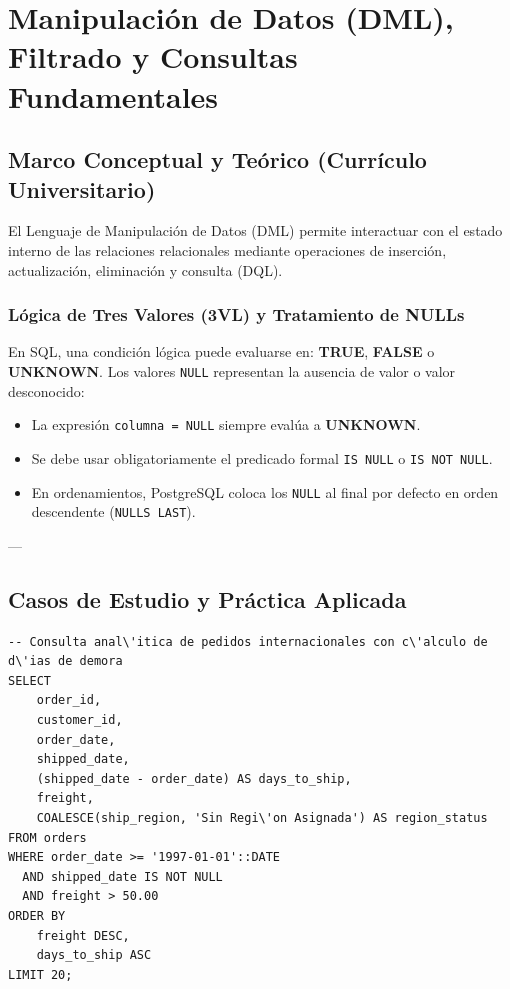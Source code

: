 \chapter{Manipulaci\'on de Datos (DML), Filtrado y Consultas Fundamentales}
\label{cap:dml_consultas_basicas}

\section{Marco Conceptual y Te\'orico (Curr\'iculo Universitario)}

El Lenguaje de Manipulaci\'on de Datos (DML) permite interactuar con el estado interno de las relaciones relacionales mediante operaciones de inserci\'on, actualizaci\'on, eliminaci\'on y consulta (DQL).

\subsection{L\'ogica de Tres Valores (3VL) y Tratamiento de NULLs}
En SQL, una condici\'on l\'ogica puede evaluarse en: \textbf{TRUE}, \textbf{FALSE} o \textbf{UNKNOWN}. Los valores \texttt{NULL} representan la ausencia de valor o valor desconocido:
\begin{itemize}
    \item La expresi\'on \texttt{columna = NULL} siempre eval\'ua a \textbf{UNKNOWN}.
    \item Se debe usar obligatoriamente el predicado formal \texttt{IS NULL} o \texttt{IS NOT NULL}.
    \item En ordenamientos, PostgreSQL coloca los \texttt{NULL} al final por defecto en orden descendente (\texttt{NULLS LAST}).
\end{itemize}

---

\section{Casos de Estudio y Pr\'actica Aplicada}

\begin{lstlisting}[style=sqlstyle, caption={Filtrado riguroso de pedidos con funciones escalares y fechas}]
-- Consulta anal\'itica de pedidos internacionales con c\'alculo de d\'ias de demora
SELECT
    order_id,
    customer_id,
    order_date,
    shipped_date,
    (shipped_date - order_date) AS days_to_ship,
    freight,
    COALESCE(ship_region, 'Sin Regi\'on Asignada') AS region_status
FROM orders
WHERE order_date >= '1997-01-01'::DATE
  AND shipped_date IS NOT NULL
  AND freight > 50.00
ORDER BY
    freight DESC,
    days_to_ship ASC
LIMIT 20;
\end{lstlisting}

